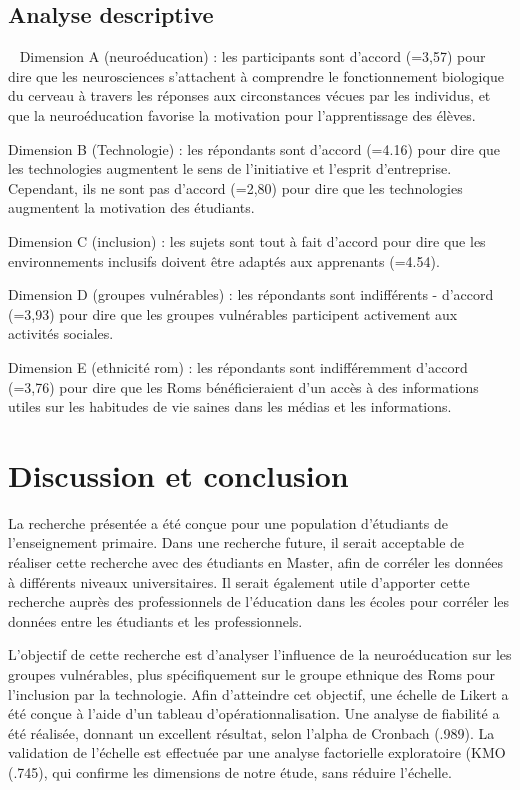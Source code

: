 \documentclass[french]{textolivre}
\begin{document}
\subsection{Analyse descriptive}
 
Dimension A (neuroéducation) : les participants sont d'accord (=3,57) pour dire que les neurosciences s'attachent à comprendre le fonctionnement biologique du cerveau à travers les réponses aux circonstances vécues par les individus, et que la neuroéducation favorise la motivation pour l'apprentissage des élèves.

Dimension B (Technologie) : les répondants sont d'accord (=4.16) pour dire que les technologies augmentent le sens de l'initiative et l'esprit d'entreprise. Cependant, ils ne sont pas d'accord (=2,80) pour dire que les technologies augmentent la motivation des étudiants.

Dimension C (inclusion) : les sujets sont tout à fait d'accord pour dire que les environnements inclusifs doivent être adaptés aux apprenants (=4.54).

Dimension D (groupes vulnérables) : les répondants sont indifférents - d'accord (=3,93) pour dire que les groupes vulnérables participent activement aux activités sociales.

Dimension E (ethnicité rom) : les répondants sont indifféremment d'accord (=3,76) pour dire que les Roms bénéficieraient d'un accès à des informations utiles sur les habitudes de vie saines dans les médias et les informations.


\section{Discussion et conclusion}\label{sec-fmt-manuscrito}
La recherche présentée a été conçue pour une population d'étudiants de l'enseignement primaire. Dans une recherche future, il serait acceptable de réaliser cette recherche avec des étudiants en Master, afin de corréler les données à différents niveaux universitaires. Il serait également utile d’apporter  cette recherche auprès des professionnels de l'éducation dans les écoles pour corréler les données entre les étudiants et les professionnels.

L’objectif de cette recherche est d'analyser l'influence de la neuroéducation sur les groupes vulnérables, plus spécifiquement sur le groupe ethnique des Roms pour l'inclusion par la technologie. Afin d'atteindre cet objectif, une échelle de Likert a été conçue à l'aide d'un tableau d'opérationnalisation. Une analyse de fiabilité a été réalisée, donnant un excellent résultat, selon l'alpha de Cronbach (.989). La validation de l'échelle est effectuée par une analyse factorielle exploratoire (KMO (.745), qui confirme les dimensions de notre étude, sans réduire l'échelle.
\end{document}
